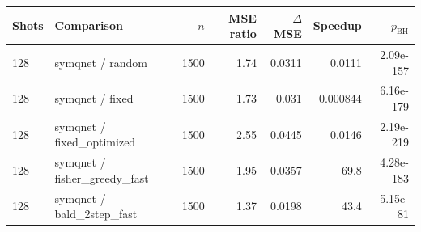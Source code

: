 \begin{tabular}{llrrrrr}
\toprule
Shots & Comparison & $n$ & MSE ratio & $\Delta$MSE & Speedup & $p_{\mathrm{BH}}$ \\
\midrule
128 & symqnet / random & 1500 & 1.74 & 0.0311 & 0.0111 & 2.09e-157 \\
128 & symqnet / fixed & 1500 & 1.73 & 0.031 & 0.000844 & 6.16e-179 \\
128 & symqnet / fixed\_optimized & 1500 & 2.55 & 0.0445 & 0.0146 & 2.19e-219 \\
128 & symqnet / fisher\_greedy\_fast & 1500 & 1.95 & 0.0357 & 69.8 & 4.28e-183 \\
128 & symqnet / bald\_2step\_fast & 1500 & 1.37 & 0.0198 & 43.4 & 5.15e-81 \\
\bottomrule
\end{tabular}
